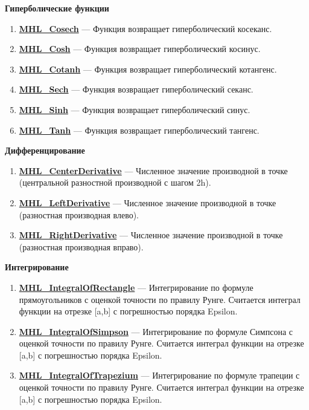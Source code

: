 \documentclass[a4paper,12pt]{article}
\begin{document}
\textbf{Гиперболические функции}
\begin{enumerate}

\item \textbf{\hyperref[MHL_Cosech]{MHL\_Cosech}} --- Функция возвращает гиперболический косеканс.

\item \textbf{\hyperref[MHL_Cosh]{MHL\_Cosh}} --- Функция возвращает гиперболический косинус.

\item \textbf{\hyperref[MHL_Cotanh]{MHL\_Cotanh}} --- Функция возвращает гиперболический котангенс.

\item \textbf{\hyperref[MHL_Sech]{MHL\_Sech}} --- Функция возвращает гиперболический секанс.

\item \textbf{\hyperref[MHL_Sinh]{MHL\_Sinh}} --- Функция возвращает гиперболический синус.

\item \textbf{\hyperref[MHL_Tanh]{MHL\_Tanh}} --- Функция возвращает гиперболический тангенс.

\end{enumerate}

\textbf{Дифференцирование}
\begin{enumerate}

\item \textbf{\hyperref[MHL_CenterDerivative]{MHL\_CenterDerivative}} --- Численное значение производной в точке (центральной разностной производной с шагом 2h).

\item \textbf{\hyperref[MHL_LeftDerivative]{MHL\_LeftDerivative}} --- Численное значение производной в точке (разностная производная влево).

\item \textbf{\hyperref[MHL_RightDerivative]{MHL\_RightDerivative}} --- Численное значение производной в точке (разностная производная вправо).

\end{enumerate}

\textbf{Интегрирование}
\begin{enumerate}

\item \textbf{\hyperref[MHL_IntegralOfRectangle]{MHL\_IntegralOfRectangle}} --- Интегрирование по формуле прямоугольников с оценкой точности по правилу Рунге. Считается интеграл функции на отрезке [a,b] с погрешностью порядка Epsilon.

\item \textbf{\hyperref[MHL_IntegralOfSimpson]{MHL\_IntegralOfSimpson}} --- Интегрирование по формуле Симпсона с оценкой точности по правилу Рунге. Считается интеграл функции на отрезке [a,b] с погрешностью порядка Epsilon.

\item \textbf{\hyperref[MHL_IntegralOfTrapezium]{MHL\_IntegralOfTrapezium}} --- Интегрирование по формуле трапеции с оценкой точности по правилу Рунге. Считается интеграл функции на отрезке [a,b] с погрешностью порядка Epsilon.

\end{enumerate}
\end{document}
